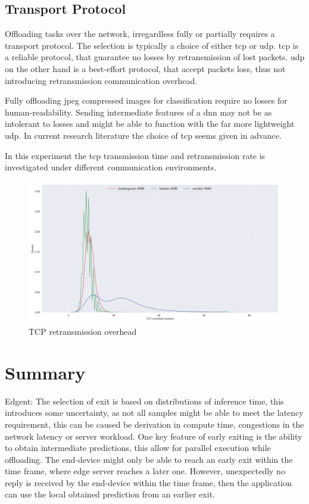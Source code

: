 \subsection{Transport Protocol} 

Offloading tasks over the network, irregardless fully or partially requires a transport protocol. The selection is typically a choice of either \gls{tcp} or \gls{udp}. \gls{tcp} is a reliable protocol, that guarantee no losses by retransmission of lost packets. \gls{udp} on the other hand is a best-effort protocol, that accept packets loss, thus not introducing retransmission communication overhead. 


Fully offloading \gls{jpeg} compressed images for classification require no losses for human-readability. Sending intermediate features of a \gls{dnn} may not be as intolerant to losses and might be able to function with the far more lightweight \gls{udp}. In current research literature the choice of \gls{tcp} seems given in advance.  

In this experiment the \gls{tcp} transmission time and retransmission rate is investigated under different communication environments. 

\begin{figure}
	\centering
	\includegraphics[width=\linewidth]{figures/tcp/tcpoverhead}
	\caption[TCP retransmission overhead]{TCP retransmission overhead}
\end{figure}

\section{Summary}

Edgent: The selection of exit is based on distributions of inference time, this introduces some uncertainty, as not all samples might be able to meet the latency requirement, this can be caused be derivation in compute time, congestions in the network latency or server workload. One key feature of early exiting is the ability to obtain intermediate predictions, this allow for parallel execution while offloading. The end-device might only be able to reach an early exit within the time frame, where edge server reaches a later one. However, unexpectedly no reply is received by the end-device within the time frame, then the application can use the local obtained prediction from an earlier exit. 

